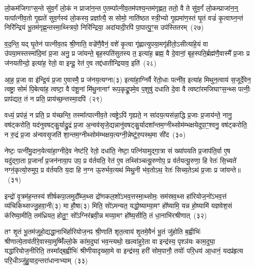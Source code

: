 लो॒कम॑जिगाꣳस॒न्ते सु॑व॒र्गं लो॒कं न प्राजा॑न॒न्त ए॒तम्पा᳚त्नीव॒तम॑पश्य॒न्तम॑गृह्णत॒ ततो॒ वै ते सु॑व॒र्गं लो॒कम्प्राजा॑न॒न्॒ यत्पा᳚त्नीव॒तो गृ॒ह्यते॑ सुव॒र्गस्य॑ लो॒कस्य॒ प्रज्ञा᳚त्यै॒ स सोमो॒ नाति॑ष्ठत स्त्री॒भ्यो गृ॒ह्यमा॑ण॒स्तं घृ॒तं वज्रं॑ कृ॒त्वाघ्न॒न्तं निरि॑न्द्रियं भू॒तम॑गृह्ण॒न्तस्मा॒थ्स्त्रियो॒ निरि॑न्द्रिया॒ अदा॑यादी॒रपि॑ पा॒पात्पु॒ꣳ॒स उप॑स्तितरम्~(२७)

व॒द॒न्ति॒ यद् घृ॒तेन॑ पात्नीव॒तꣴ श्री॒णाति॒ वज्रे॑णै॒वैनं॒ वशे॑ कृ॒त्वा गृ॑ह्णात्युपया॒मगृ॑हीतो॒\-ऽसीत्या॑हे॒यं वा उ॑पया॒मस्तस्मा॑दि॒मां प्र॒जा अनु॒ प्र जा॑यन्ते॒ बृह॒स्पति॑सुतस्य त॒ इत्या॑ह॒ ब्रह्म॒ वै दे॒वानां॒ बृह॒स्पति॒र्ब्रह्म॑णै॒वास्मै᳚ प्र॒जाः प्र ज॑नयतीन्दो॒ इत्या॑ह॒ रेतो॒ वा इन्दू॒ रेत॑ ए॒व तद्द॑धातीन्द्रियाव॒ इति॑~(२८)

आ॒ह॒ प्र॒जा वा इ॑न्द्रि॒यं प्र॒जा ए॒वास्मै॒ प्र ज॑नय॒त्यग्ना(३) इत्या॑हा॒ग्निर्वै रे॑तो॒धाः पत्नी॑व॒ इत्या॑ह मिथुन॒त्वाय॑ स॒जूर्दे॒वेन॒ त्वष्ट्रा॒ सोमं॑ पि॒बेत्या॑ह॒ त्वष्टा॒ वै प॑शू॒नां मि॑थु॒नानाꣳ॑ रूप॒कृद्रू॒पमे॒व प॒शुषु॑ दधाति दे॒वा वै त्वष्टा॑रमजिघाꣳस॒न्थ्स पत्नीः॒ प्राप॑द्यत॒ तं न प्रति॒ प्राय॑च्छ॒न्तस्मा॒दपि॑~(२९)

वध्यं॒ प्रप॑न्नं॒ न प्रति॒ प्र य॑च्छन्ति॒ तस्मा᳚त्पात्नीव॒ते त्वष्ट्रे\-ऽपि॑ गृह्यते॒ न सा॑दय॒त्यस॑न्ना॒द्धि प्र॒जाः प्र॒जाय॑न्ते॒ नानु॒ वष॑ट्करोति॒ यद॑नुवषट्कु॒र्याद्रु॒द्रं प्र॒जा अ॒न्वव॑सृजे॒द्यन्नानु॑वषट्कु॒र्यादशा᳚न्तम॒ग्नीथ्सोम॑म्भक्षयेदुपा॒ꣳ॒श्वनु॒ वष॑ट्करोति॒ न रु॒द्रं प्र॒जा अ॑न्ववसृ॒जति॑ शा॒न्तम॒ग्नीथ्सोम॑म्भक्षय॒त्यग्नी॒न्नेष्टु॑रु॒पस्थ॒मा सी॑द~(३०)

नेष्टः॒ पत्नी॑मु॒दान॒येत्या॑हा॒ग्नीदे॒व नेष्ट॑रि॒ रेतो॒ दधा॑ति॒ नेष्टा॒ पत्नि॑यामुद्गा॒त्रा सं ख्या॑पयति प्र॒जा\-प॑ति॒र्वा ए॒ष यदु॑द्गा॒ता प्र॒जानां᳚ प्र॒जन॑नाया॒प उप॒ प्र व॑र्तयति॒ रेत॑ ए॒व तथ्सि॑ञ्चत्यू॒रुणोप॒ प्र व॑र्तयत्यू॒रुणा॒ हि रेतः॑ सि॒च्यते॑ नग्नं॒कृत्यो॒रुमुप॒ प्र व॑र्तयति य॒दा हि न॒ग्न ऊ॒रुर्भव॒त्यथ॑ मिथु॒नी भ॑व॒तो\-ऽथ॒ रेतः॑ सिच्य॒ते\-ऽथ॑ प्र॒जाः प्र जा॑यन्ते॥~(३१)

{\anuvakamend[{पत्नीः᳚ सुव॒र्गमुप॑स्तितरमिन्द्रियाव॒ इत्यपि॑ सीद मिथु॒न्य॑ष्टौ च॑}]}%

इन्द्रो॑ वृ॒त्रम॑ह॒न्तस्य॑ शीर्\mbox{}षकपा॒लमुदौ᳚ब्ज॒थ्स द्रो॑णकल॒शो॑\-ऽभव॒त्तस्मा॒थ्सोमः॒ सम॑स्रव॒थ्स हा॑रियोज॒नो॑\-ऽभव॒त्तं व्य॑चिकिथ्सज्जु॒हवा॒नी(३) मा हौ॒षा(३) मिति॒ सो॑\-ऽमन्यत॒ यद्धो॒ष्याम्या॒मꣳ हो᳚ष्यामि॒ यन्न हो॒ष्यामि॑ यज्ञवेश॒सं क॑रिष्या॒मीति॒ तम॑ध्रियत॒ होतु॒ꣳ॒ सो᳚\-ऽग्निर॑ब्रवी॒न्न मय्या॒मꣳ हो᳚ष्य॒सीति॒ तं धा॒नाभि॑रश्रीणात्~(३२)

तꣳ शृ॒तं भू॒तम॑जुहो॒द्यद्धा॒नाभि॑र्\mbox{}हारियोज॒नꣴ श्री॒णाति॑ शृत॒त्वाय॑ शृ॒तमे॒वैनं॑ भू॒तं जु॑होति ब॒ह्वीभिः॑ श्रीणात्ये॒ताव॑ती\-रे॒वास्या॒मुष्मिँ॑ल्लो॒के का॑म॒दुघा॑ भव॒न्त्यथो॒ खल्वा॑हुरे॒ता वा इन्द्र॑स्य॒ पृश्ञ॑यः काम॒दुघा॒ यद्धा॑रियोज॒नीरिति॒ तस्मा᳚द्ब॒ह्वीभिः॑ श्रीणीयादृख्सा॒मे वा इन्द्र॑स्य॒ हरी॑ सोम॒पानौ॒ तयोः᳚ परि॒धय॑ आ॒धानं॒ यदप्र॑हृत्य परि॒धीञ्जु॑हु॒याद॒न्तरा॑धानाभ्याम्~(३३)

